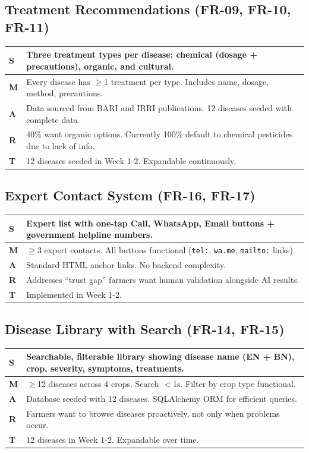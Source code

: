\documentclass[12pt,a4paper]{article}
\begin{document}
\subsection{Treatment Recommendations (FR-09, FR-10, FR-11)}
\begin{tabularx}{\textwidth}{|l|X|}
\hline
\rowcolor{lightgreen}
\textbf{S} & Three treatment types per disease: chemical (dosage + precautions), organic, and cultural. \\
\hline
\textbf{M} & Every disease has $\geq$1 treatment per type. Includes name, dosage, method, precautions. \\
\hline
\textbf{A} & Data sourced from BARI and IRRI publications. 12 diseases seeded with complete data. \\
\hline
\textbf{R} & 40\% want organic options. Currently 100\% default to chemical pesticides due to lack of info. \\
\hline
\textbf{T} & 12 diseases seeded in Week 1-2. Expandable continuously. \\
\hline
\end{tabularx}

\subsection{Expert Contact System (FR-16, FR-17)}
\begin{tabularx}{\textwidth}{|l|X|}
\hline
\rowcolor{lightgreen}
\textbf{S} & Expert list with one-tap Call, WhatsApp, Email buttons + government helpline numbers. \\
\hline
\textbf{M} & $\geq$3 expert contacts. All buttons functional (\texttt{tel:}, \texttt{wa.me}, \texttt{mailto:} links). \\
\hline
\textbf{A} & Standard HTML anchor links. No backend complexity. \\
\hline
\textbf{R} & Addresses ``trust gap'' farmers want human validation alongside AI results. \\
\hline
\textbf{T} & Implemented in Week 1-2. \\
\hline
\end{tabularx}

\subsection{Disease Library with Search (FR-14, FR-15)}
\begin{tabularx}{\textwidth}{|l|X|}
\hline
\rowcolor{lightgreen}
\textbf{S} & Searchable, filterable library showing disease name (EN + BN), crop, severity, symptoms, treatments. \\
\hline
\textbf{M} & $\geq$12 diseases across 4 crops. Search $<$1s. Filter by crop type functional. \\
\hline
\textbf{A} & Database seeded with 12 diseases. SQLAlchemy ORM for efficient queries. \\
\hline
\textbf{R} & Farmers want to browse diseases proactively, not only when problems occur. \\
\hline
\textbf{T} & 12 diseases in Week 1-2. Expandable over time. \\
\hline
\end{tabularx}
\end{document}
